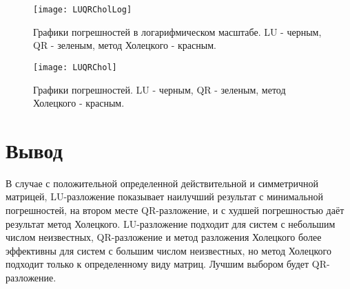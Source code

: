 \begin{figure}[H]
	\begin{center}
		\texttt{[image: LUQRCholLog]}
		\caption{Графики погрешностей в логарифмическом масштабе. LU - черным, QR - зеленым, метод Холецкого - красным.}
		\label{pic:luqr} %
	\end{center}
\end{figure}

\begin{figure}[H]
	\begin{center}
		\texttt{[image: LUQRChol]}
		\caption{Графики погрешностей. LU - черным, QR - зеленым, метод Холецкого - красным.}
		\label{pic:luqr} %
	\end{center}
\end{figure}


\section{Вывод}
В случае с положительной определенной действительной и симметричной матрицей, LU-разложение показывает наилучший результат с минимальной погрешностей, на втором месте QR-разложение, и с худшей погрешностью даёт результат метод Холецкого. LU-разложение подходит для систем с небольшим числом неизвестных, QR-разложение и метод разложения Холецкого более эффективны для систем с большим числом неизвестных, но метод Холецкого подходит только к определенному виду матриц. Лучшим выбором будет QR-разложение.